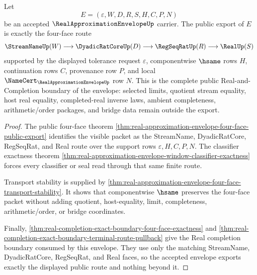 \begin{theorem}
\label{thm:real-approximation-envelope-public-export-boundary}
Let
$$
E=(\varepsilon,W,D,R,S,H,C,P,N)
$$
be an accepted $\RealApproximationEnvelopeUp$ carrier. The public export of $E$ is exactly the four-face route
$$
\StreamNameUp(W) \longrightarrow \DyadicRatCoreUp(D) \longrightarrow \RegSeqRatUp(R) \longrightarrow \RealUp(S)
$$
supported by the displayed tolerance request $\varepsilon$, componentwise $\hsame$ rows $H$, continuation rows $C$, provenance row $P$, and local $\NameCert_{\RealApproximationEnvelopeUp}$ row $N$. This is the complete public Real-and-Completion boundary of the envelope: selected limits, quotient stream equality, host real equality, completed-real inverse laws, ambient completeness, arithmetic/order packages, and bridge data remain outside the export.
\end{theorem}
\begin{proof}
The public four-face theorem \autoref{thm:real-approximation-envelope-four-face-public-export} identifies the visible packet as the StreamName, DyadicRatCore, RegSeqRat, and Real route over the support rows $\varepsilon,H,C,P,N$. The classifier exactness theorem \autoref{thm:real-approximation-envelope-window-classifier-exactness} forces every classifier or seal read through that same finite route.

Transport stability is supplied by \autoref{thm:real-approximation-envelope-four-face-transport-stability}. It shows that componentwise $\hsame$ preserves the four-face packet without adding quotient, host-equality, limit, completeness, arithmetic/order, or bridge coordinates.

Finally, \autoref{thm:real-completion-exact-boundary-four-face-exactness} and \autoref{thm:real-completion-exact-boundary-terminal-route-pullback} give the Real completion boundary consumed by this envelope. They use only the matching StreamName, DyadicRatCore, RegSeqRat, and Real faces, so the accepted envelope exports exactly the displayed public route and nothing beyond it.
\end{proof}

